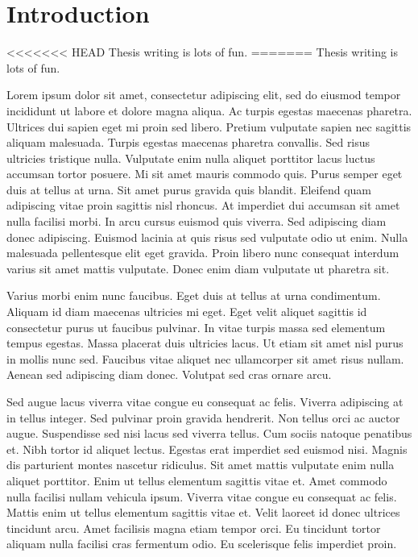 \chapter{Introduction}
<<<<<<< HEAD
Thesis writing is lots of fun.
=======
Thesis writing is lots of fun.

Lorem ipsum dolor sit amet, consectetur adipiscing elit, sed do eiusmod tempor incididunt ut labore et dolore magna aliqua. Ac turpis egestas maecenas pharetra. Ultrices dui sapien eget mi proin sed libero. Pretium vulputate sapien nec sagittis aliquam malesuada. Turpis egestas maecenas pharetra convallis. Sed risus ultricies tristique nulla. Vulputate enim nulla aliquet porttitor lacus luctus accumsan tortor posuere. Mi sit amet mauris commodo quis. Purus semper eget duis at tellus at urna. Sit amet purus gravida quis blandit. Eleifend quam adipiscing vitae proin sagittis nisl rhoncus. At imperdiet dui accumsan sit amet nulla facilisi morbi. In arcu cursus euismod quis viverra. Sed adipiscing diam donec adipiscing. Euismod lacinia at quis risus sed vulputate odio ut enim. Nulla malesuada pellentesque elit eget gravida. Proin libero nunc consequat interdum varius sit amet mattis vulputate. Donec enim diam vulputate ut pharetra sit.

Varius morbi enim nunc faucibus. Eget duis at tellus at urna condimentum. Aliquam id diam maecenas ultricies mi eget. Eget velit aliquet sagittis id consectetur purus ut faucibus pulvinar. In vitae turpis massa sed elementum tempus egestas. Massa placerat duis ultricies lacus. Ut etiam sit amet nisl purus in mollis nunc sed. Faucibus vitae aliquet nec ullamcorper sit amet risus nullam. Aenean sed adipiscing diam donec. Volutpat sed cras ornare arcu.

Sed augue lacus viverra vitae congue eu consequat ac felis. Viverra adipiscing at in tellus integer. Sed pulvinar proin gravida hendrerit. Non tellus orci ac auctor augue. Suspendisse sed nisi lacus sed viverra tellus. Cum sociis natoque penatibus et. Nibh tortor id aliquet lectus. Egestas erat imperdiet sed euismod nisi. Magnis dis parturient montes nascetur ridiculus. Sit amet mattis vulputate enim nulla aliquet porttitor. Enim ut tellus elementum sagittis vitae et. Amet commodo nulla facilisi nullam vehicula ipsum. Viverra vitae congue eu consequat ac felis. Mattis enim ut tellus elementum sagittis vitae et. Velit laoreet id donec ultrices tincidunt arcu. Amet facilisis magna etiam tempor orci. Eu tincidunt tortor aliquam nulla facilisi cras fermentum odio. Eu scelerisque felis imperdiet proin.

